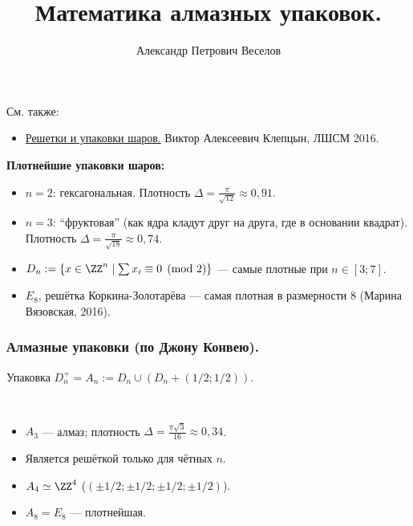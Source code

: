 \documentclass[12pt,a4paper]{article}
\title{Математика алмазных упаковок.}
\author{Александр Петрович Веселов}
\begin{document}
    \maketitle

    См. также:
    \begin{itemize}
        \item \href{https://mccme.ru/dubna/2016/courses/kleptsyn.html}{Решетки и упаковки шаров.} Виктор Алексеевич Клепцын, ЛШСМ 2016.
    \end{itemize}

    \textbf{Плотнейшие упаковки шаров:}
    \begin{itemize}
        \item $n=2$: гексагональная. Плотность $\Delta = \frac{\pi}{\sqrt{12}} \approx 0{,}91$.
        \item $n=3$: ``фруктовая'' (как ядра кладут друг на друга, где в основании квадрат). Плотность $\Delta = \frac{\pi}{\sqrt{18}} \approx 0{,}74$.
        \item $D_n := \{x \in \ZZ^n \mid \sum x_i \equiv 0 \pmod{2}\}$ --- самые плотные при $n \in [3; 7]$.
        \item $E_8$, решётка Коркина-Золотарёва --- самая плотная в размерности 8 (Марина Вязовская, 2016).
    \end{itemize}

    \subsubsection*{Алмазные упаковки (по Джону Конвею).}

    \begin{definition}
        Упаковка $D_n^+ = A_n := D_n \cup (D_n + (1/2; 1/2))$.
    \end{definition}

    \begin{remark}\ 
        \begin{itemize}
            \item $A_3$ --- алмаз; плотность $\Delta = \frac{\pi \sqrt{3}}{16} \approx 0{,}34$.
            \item Является решёткой только для чётных $n$.
            \item $A_4 \simeq \ZZ^4$ ($(\pm 1/2; \pm 1/2; \pm 1/2; \pm 1/2)$).
            \item $A_8 = E_8$ --- плотнейшая.
        \end{itemize}
    \end{remark}
\end{document}
